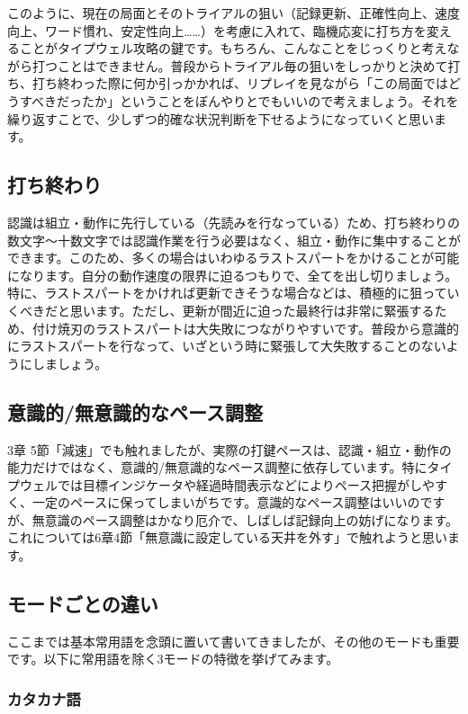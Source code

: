 このように、現在の局面とそのトライアルの狙い（記録更新、正確性向上、速度向上、ワード慣れ、安定性向上……）を考慮に入れて、臨機応変に打ち方を変えることがタイプウェル攻略の鍵です。もちろん、こんなことをじっくりと考えながら打つことはできません。普段からトライアル毎の狙いをしっかりと決めて打ち、打ち終わった際に何か引っかかれば、リプレイを見ながら「この局面ではどうすべきだったか」ということをぼんやりとでもいいので考えましょう。それを繰り返すことで、少しずつ的確な状況判断を下せるようになっていくと思います。

\subsection{打ち終わり}

認識は組立・動作に先行している（先読みを行なっている）ため、打ち終わりの数文字～十数文字では認識作業を行う必要はなく、組立・動作に集中することができます。このため、多くの場合はいわゆるラストスパートをかけることが可能になります。自分の動作速度の限界に迫るつもりで、全てを出し切りましょう。特に、ラストスパートをかければ更新できそうな場合などは、積極的に狙っていくべきだと思います。ただし、更新が間近に迫った最終行は非常に緊張するため、付け焼刃のラストスパートは大失敗につながりやすいです。普段から意識的にラストスパートを行なって、いざという時に緊張して大失敗することのないようにしましょう。

\subsection{意識的/無意識的なペース調整}

3章 5節「減速」でも触れましたが、実際の打鍵ペースは、認識・組立・動作の能力だけではなく、意識的/無意識的なペース調整に依存しています。特にタイプウェルでは目標インジケータや経過時間表示などによりペース把握がしやすく、一定のペースに保ってしまいがちです。意識的なペース調整はいいのですが、無意識のペース調整はかなり厄介で、しばしば記録向上の妨げになります。これについては6章4節「無意識に設定している天井を外す」で触れようと思います。

\subsection{モードごとの違い}

ここまでは基本常用語を念頭に置いて書いてきましたが、その他のモードも重要です。以下に常用語を除く3モードの特徴を挙げてみます。

\subsubsection*{カタカナ語}

